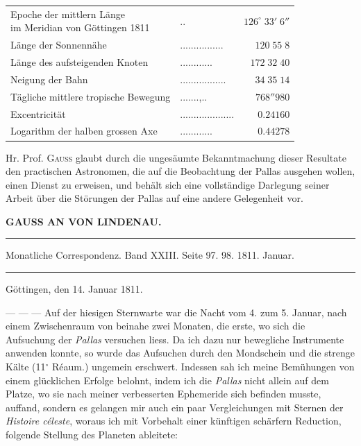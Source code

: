 \begin{center}\fontsize{10}{12}\selectfont\setlength{\tabcolsep}{4pt}\renewcommand{\arraystretch}{1.15}\begin{tabular}{llr}
\shortstack[l]{Epoche der mittlern Länge\\im Meridian von Göttingen 1811} & .\;. & $126^\circ\;33'\;6''$\\
Länge der Sonnennähe & .\;.\;.\;.\;.\;.\;.\;.\;.\;.\;.\;.\;.\;.\;.\;. & $120\;55\;8$\\
Länge des aufsteigenden Knoten & .\;.\;.\;.\;.\;.\;.\;.\;.\;.\;.\;. & $172\;32\;40$\\
Neigung der Bahn & .\;.\;.\;.\;.\;.\;.\;.\;.\;.\;.\;.\;.\;.\;.\;.\;. & $34\;35\;14$\\
Tägliche mittlere tropische Bewegung & .\;.\;.\;.\;.\;.\;.\;,\;.\;. & $768''980$\\
Excentricität & .\;.\;.\;.\;.\;.\;.\;.\;.\;.\;.\;.\;.\;.\;.\;.\;.\;.\;.\;. & $0.24160$\\
Logarithm der halben grossen Axe & .\;.\;.\;.\;.\;.\;.\;.\;.\;.\;.\;. & $0.44278$\\
\end{tabular}\end{center}

\par\indent Hr. Prof. \textsc{Gauss} glaubt durch die ungesäumte Bekanntmachung dieser Resultate den practischen Astronomen, die auf die Beobachtung der Pallas ausgehen wollen, einen Dienst zu erweisen, und behält sich eine vollständige Darlegung seiner Arbeit über die Störungen der Pallas auf eine andere Gelegenheit vor.
\clearpage{}
\begin{center}\textbf{GAUSS AN VON LINDENAU.}\par\vspace{4pt}\hrule\vspace{4pt}\fontsize{10}{12}\selectfont Monatliche Correspondenz. Band XXIII. Seite 97. 98. 1811. Januar.\par\vspace{4pt}\hrule\vspace{4pt}\end{center}

\begin{flushright}Göttingen, den 14. Januar 1811.\end{flushright}
\par\indent --- --- --- Auf der hiesigen Sternwarte war die Nacht vom 4. zum 5. Januar, nach einem Zwischenraum von beinahe zwei Monaten, die erste, wo sich die Aufsuchung der \emph{Pallas} versuchen liess. Da ich dazu nur bewegliche Instrumente anwenden konnte, so wurde das Aufsuchen durch den Mondschein und die strenge Kälte (11$^\circ$ Réaum.) ungemein erschwert. Indessen sah ich meine Bemühungen von einem glücklichen Erfolge belohnt, indem ich die \emph{Pallas} nicht allein auf dem Platze, wo sie nach meiner verbesserten Ephemeride sich befinden musste, auffand, sondern es gelangen mir auch ein paar Vergleichungen mit Sternen der \emph{Histoire céleste}, woraus ich mit Vorbehalt einer künftigen schärfern Reduction, folgende Stellung des Planeten ableitete:

